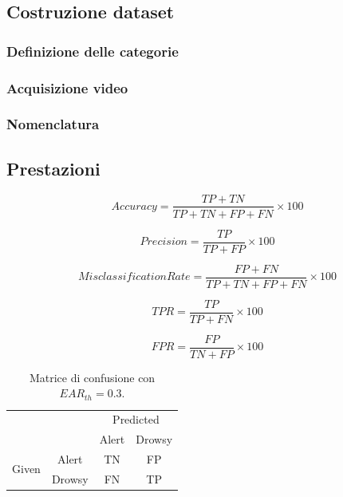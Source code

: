 \documentclass[12pt]{article}
\begin{document}
\subsection{Costruzione dataset}
\subsubsection{Definizione delle categorie}
\subsubsection{Acquisizione video}
\subsubsection{Nomenclatura}

\subsection{Prestazioni}

\begin{equation}
Accuracy = \frac{TP + TN}{TP + TN + FP + FN} \times 100
\end{equation}

\begin{equation}
Precision = \frac{TP}{TP + FP} \times 100
\end{equation}

\begin{equation}
MisclassificationRate = \frac{FP + FN}{TP + TN + FP + FN} \times 100
\end{equation}

\begin{equation}
TPR = \frac{TP}{TP + FN} \times 100
\end{equation}

\begin{equation}
FPR = \frac{FP}{TN + FP} \times 100
\end{equation}

\begin{table}[h]
	\centering
	\begin{tabular}{cc|c|c|}
		\cline{3-4}
		&        & \multicolumn{2}{c|}{Predicted} \\ \cline{3-4} 
		&        & Alert         & Drowsy         \\ \hline
		\multicolumn{1}{|c|}{\multirow{2}{*}{Given}} & Alert  & TN & FP\\ \cline{2-4} 
		\multicolumn{1}{|c|}{}                       & Drowsy & FN & TP\\ \hline
	\end{tabular}
	\caption{Matrice di confusione con $EAR_{th}=0.3$.}
	\label{table:cm_0_3}
\end{table}
\end{document}
